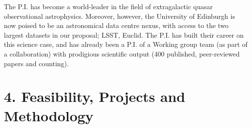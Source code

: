 \documentclass[oneside, a4paper, onecolumn, 11pt]{article}
\begin{document}
\smallskip
\smallskip
\noindent
The P.I. has become a world-leader in the field of extragalactic
quasar observational astrophysics.  Moreover, however, the University
of Edinburgh is now poised to be an astronomical data centre nexus,
with access to the two largest datasets in our proposal; LSST, Euclid. 
The P.I. has built their career on this science case, and has already been a P.I. 
of a Working group team (as part of a collaboration) with prodigious scientific
output (400 published, peer-reviewed papers and counting). 


\smallskip
\smallskip
\noindent
\section*{\textcolor{Cerulean}{4. Feasibility, Projects and Methodology}}

\end{document}

